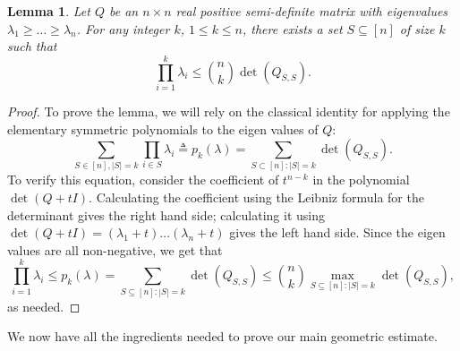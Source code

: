 \documentclass[12pt]{article}
\newtheorem{lemma}{Lemma}
\newcommand{\eqdef}{\triangleq}
\begin{document}
\begin{lemma}\label{lm:rip-det}
  Let $Q$ be an $n\times n$ real positive semi-definite matrix with
  eigenvalues $\lambda_1 \ge \ldots \ge \lambda_n$. For any integer
  $k$, $1 \le k \le n$, there exists a set $S \subseteq [n]$ of size $k$
  such that
  \[\prod_{i=1}^k \lambda_i \leq \binom{n}{k} \det(Q_{S,S}).\]
\end{lemma}
\begin{proof}
To prove the lemma, we will rely on the classical identity for applying the
elementary symmetric polynomials to the eigen values of $Q$:
\begin{equation*}
\sum_{S \in [n],|S|=k} \prod_{i \in S} \lambda_i \eqdef p_k(\lambda) = \sum_{S \subset [n]: |S| = k}\det(Q_{S,S}).
\end{equation*}
To verify this equation, consider the coefficient of $t^{n-k}$ in the polynomial
$\det(Q + tI)$. Calculating the coefficient using the Leibniz formula for the
determinant gives the right hand side; calculating it using $\det(Q + tI) =
(\lambda_1 + t)\ldots(\lambda_n + t)$ gives the left hand side. Since the eigen
values are all non-negative, we get that
\[
\prod_{i=1}^k \lambda_i \leq p_k(\lambda) =  
 \sum_{S \subseteq [n]: |S|=k} \det(Q_{S,S}) \leq \binom{n}{k} \max_{S
\subseteq [n]: |S|=k} \det(Q_{S,S}),
\]
as needed.
\end{proof}

We now have all the ingredients needed to prove our main geometric estimate.
\end{document}
